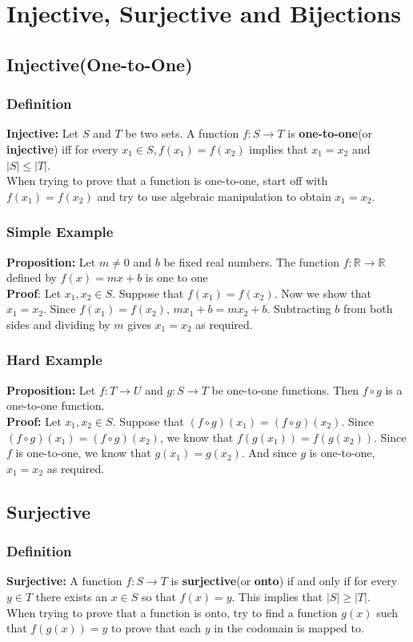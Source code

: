 \documentclass[12pt]{report}
\begin{document}
\chapter{Injective, Surjective and Bijections}
	\section{Injective(One-to-One)}
		\subsection{Definition}
			\textbf{Injective:} Let $S$ and $T$ be two sets. A function $f: S \rightarrow T$ is \textbf{one-to-one}(or \textbf{injective}) iff for every $x_1 \in S, f(x_1) = f(x_2)$ implies that $x_1 = x_2$ and $|S| \leq |T|$. \\
			When trying to prove that a function is one-to-one, start off with $f(x_1) = f(x_2)$ and try to use algebraic manipulation to obtain $x_1 = x_2$. 
		\subsection{Simple Example}
			\textbf{Proposition:} Let $m \neq 0$ and $b$ be fixed real numbers. The function $f: \mathbb{R} \rightarrow \mathbb{R}$ defined by $f(x) = mx + b$ is one to one\\
			\textbf{Proof}: Let $x_1, x_2 \in S$. Suppose that $f(x_1) = f(x_2)$. Now we show that $x_1 = x_2$. Since $f(x_1) = f(x_2)$, $mx_1 + b = mx_2 + b$. Subtracting $b$ from both sides and dividing by $m$ gives $x_1 = x_2$ as required.
		\subsection{Hard Example}
			\textbf{Proposition:} Let $f: T \rightarrow U$ and $g:S \rightarrow T$ be one-to-one functions. Then $f \circ g$ is a one-to-one function.\\
			\textbf{Proof:} Let $x_1, x_2 \in S$. Suppose that $(f \circ g)(x_1) = (f \circ g)(x_2)$. Since $(f \circ g)(x_1) = (f \circ g)(x_2)$, we know that $f(g(x_1)) = f(g(x_2))$. Since $f$ is one-to-one, we know that $g(x_1) = g(x_2)$. And since $g$ is one-to-one, $x_1 = x_2$ as required. 

	\section{Surjective}
		\subsection{Definition}
			\textbf{Surjective:} A function $f:S \rightarrow T$ is \textbf{surjective}(or \textbf{onto}) if and only if for every $y \in T$ there exists an $x \in S $ so that $f(x) = y$. This implies that $|S| \geq |T|$. \\
			When trying to prove that a function is onto, try to find a function $g(x)$ such that $f(g(x)) = y$ to prove that each $y$ in the codomain is mapped to.
\end{document}
